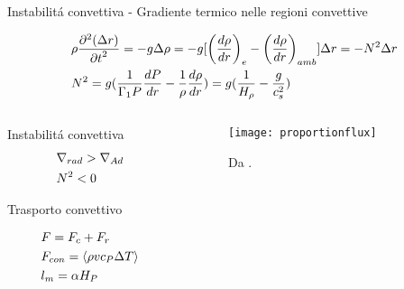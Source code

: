 \documentclass[10pt,xcolor={usenames},fleqn,mathserif,serif]{beamer}
\begin{document}
\begin{frame}{Instabilit\'a convettiva - Gradiente termico nelle regioni convettive}

\begin{align*}
&\rho\PtwoDy{t}{(\Delta r)}=-g\Delta\rho=-g[\Dcvar{\TDy{r}{\rho}}{e}-\Dcvar{\TDy{r}{\rho}}{amb}]\Delta r=-N^2\Delta r\\
&N^2=g(\frac{1}{\Gamma_1P}\TDy{r}{P}-\frac{1}{\rho}\TDy{r}{\rho})=g(\frac{1}{\densityscale{}}-\frac{g}{c_s^2})%
\end{align*}

\begin{columns}

\begin{column}{0.45\textwidth}

\begin{block}{Instabilit\'a convettiva}
\begin{align*}
&\nabla_{rad}{}>\nabla_{Ad}{}\\
&N^2<0
\end{align*}

\end{block}

\begin{block}{Trasporto convettivo}

\begin{align*}
&F=F_c+F_r\\
&F_{con}=\langle \rho vc_P\Delta T \rangle\\
&l_m=\alpha H_P
\end{align*}

\end{block}

\end{column}

\begin{column}{0.55\textwidth}

\begin{figure}[!h]
    \texttt{[image: proportionflux]}
    \caption{Da \cite{christensen1997effects}.}
\end{figure}


\end{column}

\end{columns}

\end{frame}
\end{document}
